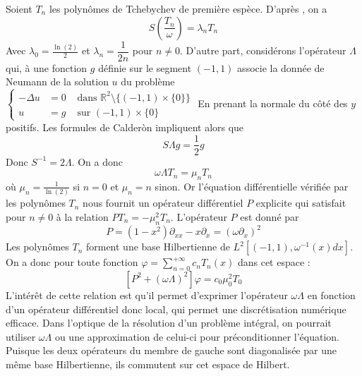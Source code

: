 \documentclass[11pt,a4paper]{article}
\begin{document}
Soient $T_n$ les polynômes de Tchebychev de première espèce. 
D'après \cite{bruno2012second}, on a 
\[ S \left(\dfrac{T_n}{\omega}\right) = \lambda_n T_n\]
Avec $\lambda_0 = \frac{\ln(2)}{2}$ et $\lambda_n = \dfrac{1}{2n}$ pour $n\neq 0$. D'autre part, considérons l'opérateur $\Lambda$ qui, à une fonction $g$ définie sur le segment $(-1,1)$ associe la donnée de Neumann de la solution $u$ du problème 
$\left\{\begin{array}{rll}
-\Delta u &= 0 & \text{ dans } \mathbb{R}^2 \setminus \{(-1,1)\times \{0\}\}\\
u &= g & \text{ sur } (-1,1)\times\{0\}
\end{array}\right.$
En prenant la normale du côté des $y$ positifs. Les formules de Calderòn impliquent alors que 
\[S\Lambda g = \frac{1}{2}g\]
Donc $S^{-1} = 2\Lambda$. On a donc 
\[ \omega\Lambda T_n = \mu_n T_n \]
où $\mu_n = \frac{1}{\ln(2)}$ si $n=0$ et $\mu_n = n$ sinon. Or l'équation différentielle vérifiée par les polynômes $T_n$ nous fournit un opérateur différentiel $P$ explicite qui satisfait pour $n \neq 0$ à la relation $PT_n = -\mu_n^2 T_n$. L'opérateur $P$ est donné par  \[ P = (1-x^2) \partial_{xx} - x\partial_x = \left(\omega \partial_x\right)^2\] 
Les polynômes $T_n$ forment une base Hilbertienne de $L^2\left[(-1,1),\omega^{-1}(x)dx\right]$. On a donc pour toute fonction $\varphi = \sum_{n=0}^{+\infty}c_n T_n(x)$ dans cet espace : 
\[\left[P^2 + (\omega\Lambda)^2\right] \varphi = c_0\mu_0^2 T_0 \]
L'intérêt de cette relation est qu'il permet d'exprimer l'opérateur $\omega\Lambda$ en fonction d'un opérateur différentiel donc local, qui permet une discrétisation numérique efficace. Dans l'optique de la résolution d'un problème intégral, on pourrait utiliser $\omega\Lambda$ ou une approximation de celui-ci pour préconditionner l'équation. 
Puisque les deux opérateurs du membre de gauche sont diagonalisée par une même base Hilbertienne, ils commutent sur cet espace de Hilbert. 


  
\end{document}
